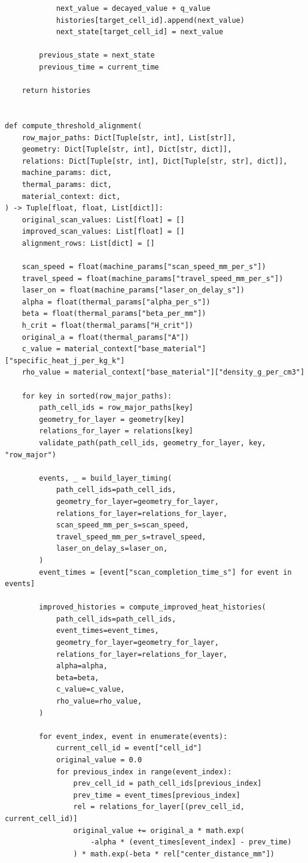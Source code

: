 \documentclass[a4paper, 12pt]{ctexart}
\begin{document}
\begin{verbatim}
            next_value = decayed_value + q_value
            histories[target_cell_id].append(next_value)
            next_state[target_cell_id] = next_value

        previous_state = next_state
        previous_time = current_time

    return histories


def compute_threshold_alignment(
    row_major_paths: Dict[Tuple[str, int], List[str]],
    geometry: Dict[Tuple[str, int], Dict[str, dict]],
    relations: Dict[Tuple[str, int], Dict[Tuple[str, str], dict]],
    machine_params: dict,
    thermal_params: dict,
    material_context: dict,
) -> Tuple[float, float, List[dict]]:
    original_scan_values: List[float] = []
    improved_scan_values: List[float] = []
    alignment_rows: List[dict] = []

    scan_speed = float(machine_params["scan_speed_mm_per_s"])
    travel_speed = float(machine_params["travel_speed_mm_per_s"])
    laser_on = float(machine_params["laser_on_delay_s"])
    alpha = float(thermal_params["alpha_per_s"])
    beta = float(thermal_params["beta_per_mm"])
    h_crit = float(thermal_params["H_crit"])
    original_a = float(thermal_params["A"])
    c_value = material_context["base_material"]["specific_heat_j_per_kg_k"]
    rho_value = material_context["base_material"]["density_g_per_cm3"]

    for key in sorted(row_major_paths):
        path_cell_ids = row_major_paths[key]
        geometry_for_layer = geometry[key]
        relations_for_layer = relations[key]
        validate_path(path_cell_ids, geometry_for_layer, key, "row_major")

        events, _ = build_layer_timing(
            path_cell_ids=path_cell_ids,
            geometry_for_layer=geometry_for_layer,
            relations_for_layer=relations_for_layer,
            scan_speed_mm_per_s=scan_speed,
            travel_speed_mm_per_s=travel_speed,
            laser_on_delay_s=laser_on,
        )
        event_times = [event["scan_completion_time_s"] for event in events]

        improved_histories = compute_improved_heat_histories(
            path_cell_ids=path_cell_ids,
            event_times=event_times,
            geometry_for_layer=geometry_for_layer,
            relations_for_layer=relations_for_layer,
            alpha=alpha,
            beta=beta,
            c_value=c_value,
            rho_value=rho_value,
        )

        for event_index, event in enumerate(events):
            current_cell_id = event["cell_id"]
            original_value = 0.0
            for previous_index in range(event_index):
                prev_cell_id = path_cell_ids[previous_index]
                prev_time = event_times[previous_index]
                rel = relations_for_layer[(prev_cell_id, current_cell_id)]
                original_value += original_a * math.exp(
                    -alpha * (event_times[event_index] - prev_time)
                ) * math.exp(-beta * rel["center_distance_mm"])


\end{verbatim}
\end{document}
